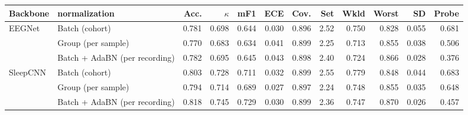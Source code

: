 \begin{tabular}{llrrrrrrrrrr}
\toprule
Backbone & normalization & \textbf{Acc.} & \textbf{$\kappa$} & \textbf{mF1} & \textbf{ECE} & \textbf{Cov.} & \textbf{Set} & \textbf{Wkld} & \textbf{Worst} & \textbf{SD} & \textbf{Probe} \\
\midrule
\multirow{3}{*}{EEGNet} & Batch (cohort) & 0.781 & 0.698 & 0.644 & 0.030 & 0.896 & 2.52 & 0.750 & 0.828 & 0.055 & 0.681 \\
 & Group (per sample) & 0.770 & 0.683 & 0.634 & 0.041 & 0.899 & 2.25 & 0.713 & 0.855 & 0.038 & 0.506 \\
 & Batch + AdaBN (per recording) & 0.782 & 0.695 & 0.645 & 0.043 & 0.898 & 2.40 & 0.724 & 0.866 & 0.028 & 0.376 \\
\midrule
\multirow{3}{*}{SleepCNN} & Batch (cohort) & 0.803 & 0.728 & 0.711 & 0.032 & 0.899 & 2.55 & 0.779 & 0.848 & 0.044 & 0.683 \\
 & Group (per sample) & 0.794 & 0.714 & 0.689 & 0.027 & 0.897 & 2.24 & 0.748 & 0.855 & 0.035 & 0.648 \\
 & Batch + AdaBN (per recording) & 0.818 & 0.745 & 0.729 & 0.030 & 0.899 & 2.36 & 0.747 & 0.870 & 0.026 & 0.457 \\
\bottomrule
\end{tabular}